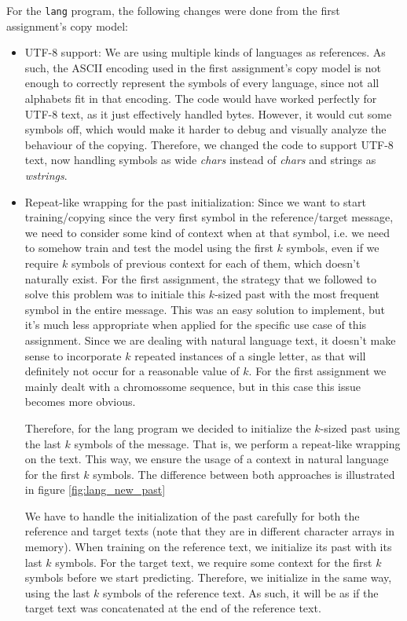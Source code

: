 \documentclass{article}
\begin{document}
For the \texttt{lang} program, the following changes were done from the first assignment's copy model:
\begin{itemize}
    \item UTF-8 support:
    We are using multiple kinds of languages as references.
    As such, the ASCII encoding used in the first assignment's copy model is not enough to correctly represent the symbols of every language, since not all alphabets fit in that encoding.
    The code would have worked perfectly for UTF-8 text, as it just effectively handled bytes.
    However, it would cut some symbols off, which would make it harder to debug and visually analyze the behaviour of the copying.
    Therefore, we changed the code to support UTF-8 text, now handling symbols as wide \textit{chars} instead of \textit{chars} and strings as \textit{wstrings}.
    
    \item Repeat-like wrapping for the past initialization:
    Since we want to start training/copying since the very first symbol in the reference/target message, we need to consider some kind of context when at that symbol, i.e. we need to somehow train and test the model using the first $k$ symbols, even if we require $k$ symbols of previous context for each of them, which doesn't naturally exist.
    For the first assignment, the strategy that we followed to solve this problem was to initiale this $k$-sized past with the most frequent symbol in the entire message.
    This was an easy solution to implement, but it's much less appropriate when applied for the specific use case of this assignment.
    Since we are dealing with natural language text, it doesn't make sense to incorporate $k$ repeated instances of a single letter, as that will definitely not occur for a reasonable value of $k$.
    For the first assignment we mainly dealt with a chromossome sequence, but in this case this issue becomes more obvious.

    Therefore, for the lang program we decided to initialize the $k$-sized past using the last $k$ symbols of the message.
    That is, we perform a repeat-like wrapping on the text.
    This way, we ensure the usage of a context in natural language for the first $k$ symbols.
    The difference between both approaches is illustrated in figure \ref{fig:lang_new_past}

    We have to handle the initialization of the past carefully for both the reference and target texts (note that they are in different character arrays in memory).
    When training on the reference text, we initialize its past with its last $k$ symbols.
    For the target text, we require some context for the first $k$ symbols before we start predicting.
    Therefore, we initialize in the same way, using the last $k$ symbols of the reference text.
    As such, it will be as if the target text was concatenated at the end of the reference text.
    

\end{itemize}
\end{document}

